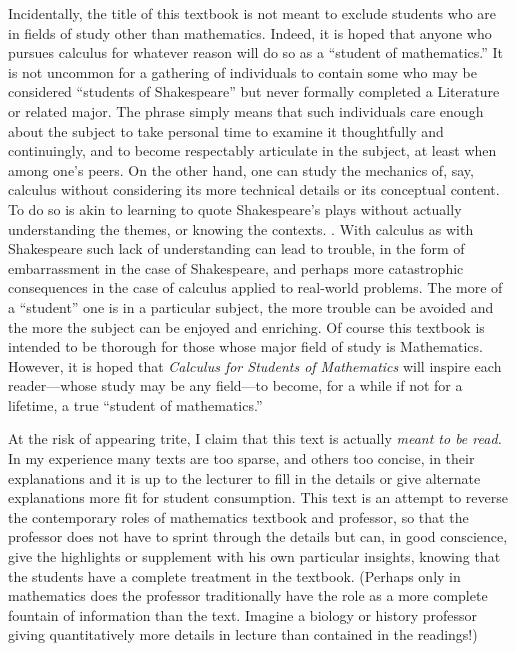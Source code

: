 Incidentally, the title of this textbook is not meant to exclude
students who are in fields of study other than mathematics.  Indeed, it 
is hoped that anyone who pursues calculus for whatever reason will
do so as a ``student of mathematics.''  It is not uncommon for
a gathering of individuals to contain some who may be considered
``students of Shakespeare'' but never formally completed
a Literature or related 
major. The phrase simply means that such individuals care enough
about the subject to  take personal time to 
examine it thoughtfully and continuingly, and
to become respectably articulate  in the subject, at least when
among one's peers.
On the other hand, one can study the mechanics of, say,  calculus without
considering its more technical details or its conceptual
content.  To do so is akin to learning to quote Shakespeare's
plays without actually understanding the themes, or knowing the contexts.
.  With calculus
as with Shakespeare such lack of understanding can lead to trouble,
in the form of embarrassment in the case of Shakespeare, and 
perhaps more catastrophic consequences in the case of calculus
applied to real-world problems.
The more of a ``student'' one is in a particular subject, the
more trouble can be avoided and the more the subject can be 
enjoyed and enriching.  Of course this textbook is intended to
be thorough for those whose major field of study is Mathematics.
However, it is hoped that 
{\it Calculus for Students of Mathematics} will inspire each
reader---whose study may be any field---to become, for a
while if not for a lifetime, a true ``student of mathematics.''

\bigskip
{}
\bigskip

At the risk of appearing trite, I claim that this text is actually {\it
meant to be read. }
In my experience many texts are too sparse, and others too concise, in their
explanations and it is up to the lecturer to fill in the
details or give alternate explanations more fit for student consumption.  
This text is an attempt to reverse the contemporary roles of
mathematics textbook and professor,
so that the professor does not have to sprint through the 
details but can, in good conscience, give the highlights or
supplement with his own particular insights,
knowing that the students have a complete treatment in the textbook.
(Perhaps only in mathematics does the professor 
traditionally have the role as a more complete fountain of
information than the text.  Imagine a biology or history
professor giving quantitatively more details
in lecture than contained in the readings!)

